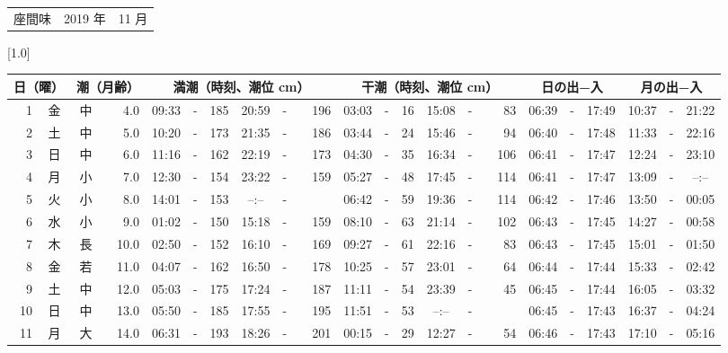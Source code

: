 \documentclass[12pt,a4j]{jsarticle}
\begin{document}
 \begin{table}[htbp]
 \begin{center}
 \begin{tabular}{lcc}
 \LARGE{座間味}  & \large{2019 年} & \large{11 月} \\
 \end{tabular}
 \end{center}
 \begin{center}
    \scalebox{0.7}[1.0]{
    \begin{tabular}{|rc|cr|ccrccr|ccrccr|ccc|ccc|}
    \hline
    \multicolumn{2}{|c|}{日（曜）} & \multicolumn{2}{c|}{潮（月齢）} & \multicolumn{6}{c|}{満潮（時刻、潮位 cm）} & \multicolumn{6}{c|}{干潮（時刻、潮位 cm）} & \multicolumn{3}{c|}{日の出−入} &  \multicolumn{3}{c|}{月の出−入}\\
 \hline
 1 & 金 & 中 &  4.0 &  09:33 &-& 185 &  20:59 &-& 196 &  03:03 &-&  16 &  15:08 &-&  83 & 06:39 & -& 17:49 & 10:37 & -& 21:22 \\
 2 & 土 & 中 &  5.0 &  10:20 &-& 173 &  21:35 &-& 186 &  03:44 &-&  24 &  15:46 &-&  94 & 06:40 & -& 17:48 & 11:33 & -& 22:16 \\
 3 & 日 & 中 &  6.0 &  11:16 &-& 162 &  22:19 &-& 173 &  04:30 &-&  35 &  16:34 &-& 106 & 06:41 & -& 17:47 & 12:24 & -& 23:10 \\
 4 & 月 & 小 &  7.0 &  12:30 &-& 154 &  23:22 &-& 159 &  05:27 &-&  48 &  17:45 &-& 114 & 06:41 & -& 17:47 & 13:09 & -& --:-- \\
 5 & 火 & 小 &  8.0 &  14:01 &-& 153 &  --:-- &-&~~~~~ &  06:42 &-&  59 &  19:36 &-& 114 & 06:42 & -& 17:46 & 13:50 & -& 00:05 \\
 6 & 水 & 小 &  9.0 &  01:02 &-& 150 &  15:18 &-& 159 &  08:10 &-&  63 &  21:14 &-& 102 & 06:43 & -& 17:45 & 14:27 & -& 00:58 \\
 7 & 木 & 長 & 10.0 &  02:50 &-& 152 &  16:10 &-& 169 &  09:27 &-&  61 &  22:16 &-&  83 & 06:43 & -& 17:45 & 15:01 & -& 01:50 \\
 8 & 金 & 若 & 11.0 &  04:07 &-& 162 &  16:50 &-& 178 &  10:25 &-&  57 &  23:01 &-&  64 & 06:44 & -& 17:44 & 15:33 & -& 02:42 \\
 9 & 土 & 中 & 12.0 &  05:03 &-& 175 &  17:24 &-& 187 &  11:11 &-&  54 &  23:39 &-&  45 & 06:45 & -& 17:44 & 16:05 & -& 03:32 \\
10 & 日 & 中 & 13.0 &  05:50 &-& 185 &  17:55 &-& 195 &  11:51 &-&  53 &  --:-- &-&~~~~~ & 06:45 & -& 17:43 & 16:37 & -& 04:24 \\
11 & 月 & 大 & 14.0 &  06:31 &-& 193 &  18:26 &-& 201 &  00:15 &-&  29 &  12:27 &-&  54 & 06:46 & -& 17:43 & 17:10 & -& 05:16 \\

\end{tabular}}
\end{center}
\end{table}
\end{document}
